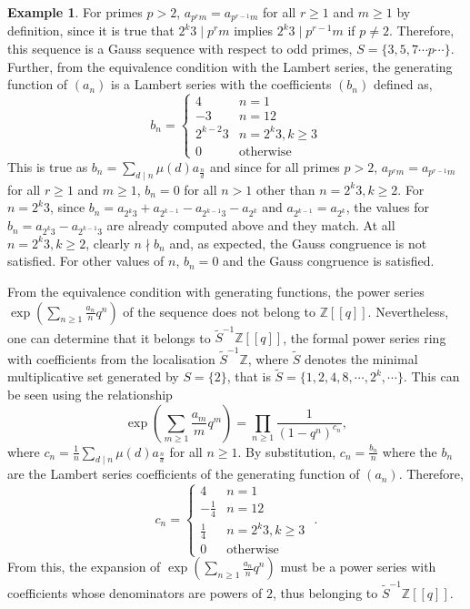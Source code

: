 \documentclass{article}
\numberwithin{equation}{section}
\theoremstyle{definition}
\newtheorem{example}[definition]{\bf {Example}}
\begin{document}
\begin{example}
For primes $p>2$, $a_{p^rm}=a_{p^{r-1}m}$ for all $r\geq1$ and $m\geq1$ by definition, since it is true that  $2^k3\mid p^rm$ implies $2^k3\mid p^{r-1}m$ if $p\neq2$. Therefore, this sequence is a Gauss sequence with respect to odd primes, $S=\{3,5,7\cdots p \cdots\}$. Further, from the equivalence condition with the Lambert series, the generating function of $(a_n)$ is a Lambert series with the coefficients $(b_n)$ defined as,  
\[
    b_n=
    \begin{cases}
        4 & n=1\\
        -3 & n=12\\
        2^{k-2}3 & n=2^k3, k\geq3\\
        0 & \text{otherwise}
    \end{cases}
\]
This is true as $b_n=\sum_{d\mid n}\mu(d)a_\frac{n}{d}$ and since for all primes $p>2$, $a_{p^rm}=a_{p^{r-1}m}$ for all $r\geq1$ and $m\geq1$, $b_n=0$ for all $n>1$ other than $n=2^k3, k\geq2$. For $n=2^k3$, since 
$b_n=a_{2^k3}+a_{2^{k-1}}-a_{2^{k-1}3}-a_{2^k}$ and $a_{2^{k-1}}=a_{2^{k}}$, the values for $b_n=a_{2^k3}-a_{2^{k-1}3}$ are already computed above and they match. At all $n=2^k3, k\geq2$, clearly $n\nmid b_n$ and, as expected, the Gauss congruence is not satisfied. For other values of $n$, $b_n=0$ and the Gauss congruence is satisfied.

From the equivalence condition with generating functions, the power series $\exp\left(\sum_{n\geq1}\frac{a_n}{n}q^n\right)$ of the sequence does not belong to $\mathbb{Z}[[q]]$. Nevertheless, one can determine that it belongs to $\tilde{S}^{-1}\mathbb{Z}[[q]]$, the formal power series ring with coefficients from the localisation $\tilde{S}^{-1}\mathbb{Z}$, where $\tilde{S}$ denotes the minimal multiplicative set generated by $S=\{2\}$, that is $\tilde{S}=\{1,2,4,8,\cdots,2^k,\cdots\}$.
This can be seen using the relationship 
\begin{equation}\label{eq:027}
\exp\left(\sum_{m\geq1}\frac{a_m}{m}q^m\right)=\prod_{n\geq1}\frac{1}{(1-q^n)^{c_n}},
\end{equation}
where $c_n=\frac{1}{n}\sum_{d\mid n}\mu(d)a_\frac{n}{d}$ for all $n\geq1$. By substitution, $c_n=\frac{b_n}{n}$ where the $b_n$ are the Lambert series coefficients of the generating function of $(a_n)$. Therefore, 
\[c_n=\begin{cases}
    4&n=1\\
    -\frac{1}{4}&n=12\\
    \frac{1}{4}&n=2^k3, k\geq3\\
    0&\text{otherwise}
\end{cases}\text{ .}\]
From this, the expansion of $\exp\left(\sum_{n\geq1}\frac{a_n}{n}q^n\right)$ must be a power series with coefficients whose denominators are powers of $2$, thus belonging to $\tilde{S}^{-1}\mathbb{Z}[[q]]$.
\end{example}
\end{document}

